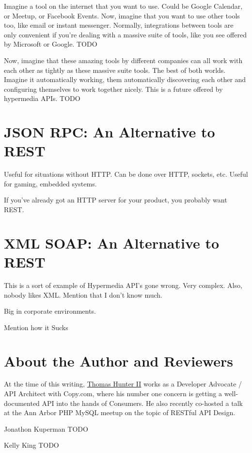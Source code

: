 \documentclass{book}
\begin{document}
Imagine a tool on the internet that you want to use. Could be Google Calendar, or Meetup, or Facebook Events. Now, imagine that you want to use other tools too, like email or instant messenger. Normally, integrations between tools are only convenient if you're dealing with a massive suite of tools, like you see offered by Microsoft or Google. TODO

Now, imagine that these amazing tools by different companies can all work with each other as tightly as these massive suite tools. The best of both worlds. Imagine it automatically working, them automatically discovering each other and configuring themselves to work together nicely. This is a future offered by hypermedia APIs. TODO


\chapter{JSON RPC: An Alternative to REST}

Useful for situations without HTTP. Can be done over HTTP, sockets, etc. Useful for gaming, embedded systems.

If you've already got an HTTP server for your product, you probably want REST.


\chapter{XML SOAP: An Alternative to REST}

This is a sort of example of Hypermedia API's gone wrong. Very complex. Also, nobody likes XML. Mention that I don't know much.

Big in corporate environments.

Mention how it Sucks


\chapter{About the Author and Reviewers}

At the time of this writing, \href{http://thomashunter.name}{Thomas Hunter II} works as a Developer Advocate / API Architect with Copy.com, where his number one concern is getting a well-documented API into the hands of Consumers. He also recently co-hosted a talk at the Ann Arbor PHP MySQL meetup on the topic of RESTful API Design.

Jonathon Kuperman TODO

Kelly King TODO
\end{document}
